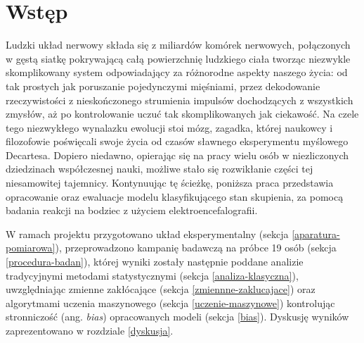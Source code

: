 \documentclass{./assets/wfis}
\begin{document}

\stronatytulowa

\begin{abstract}

\end{abstract}

\chapter{Wstęp}
Ludzki układ nerwowy składa się z miliardów komórek nerwowych, połączonych w gęstą siatkę pokrywającą całą powierzchnię ludzkiego ciała tworząc niezwykle skomplikowany system odpowiadający za różnorodne aspekty naszego życia: od tak prostych jak poruszanie pojedynczymi mięśniami, przez dekodowanie rzeczywistości z nieskończonego strumienia impulsów dochodzących z wszystkich zmysłów, aż po kontrolowanie uczuć tak skomplikowanych jak ciekawość. Na czele tego niezwykłego wynalazku ewolucji stoi mózg, zagadka, której naukowcy i filozofowie poświęcali swoje życia od czasów sławnego eksperymentu myślowego Decartesa. Dopiero niedawno, opierając się na pracy wielu osób w niezliczonych dziedzinach współczesnej nauki, możliwe stało się rozwikłanie części tej niesamowitej tajemnicy. Kontynuując tę ścieżkę, poniższa praca przedstawia opracowanie oraz ewaluacje modelu klasyfikującego stan skupienia, za pomocą badania reakcji na bodziec z użyciem elektroencefalografii. 

W ramach projektu przygotowano układ eksperymentalny (sekcja \ref{aparatura-pomiarowa}), przeprowadzono kampanię badawczą na próbce 19 osób (sekcja \ref{procedura-badan}), której wyniki zostały następnie poddane analizie tradycyjnymi metodami statystycznymi (sekcja \ref{analiza-klasyczna}), uwzględniając zmienne zakłócające (sekcja \ref{zmiennne-zaklucajace}) oraz algorytmami uczenia maszynowego (sekcja \ref{uczenie-maszynowe}) kontrolując stronniczość (ang. \textit{bias}) opracowanych modeli (sekcja \ref{bias}). Dyskusję wyników zaprezentowano w rozdziale \ref{dyskusja}.
\end{document}
